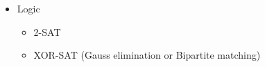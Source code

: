 \documentclass[11.5pt,a4paper,landscape,oneside]{amsart}
\newenvironment{myitemize}
{ \begin{itemize}[leftmargin=.5cm]
    \setlength{\itemsep}{0pt}
    \setlength{\parskip}{0pt}
    \setlength{\parsep}{0pt}     }
{ \end{itemize}                  }
\begin{document}
\begin{multicols*}{2}
\begin{myitemize}
\begin{itemize}
\begin{itemize}
                            \end{itemize}
                        \item Functions
                            \begin{itemize}
                                \item Sum of piecewise-linear functions is a piecewise-linear function
                                \item Sum of convex (concave) functions is convex (concave)
                            \end{itemize}
                        \item Modular arithmetic
                            \begin{itemize}
                                \item Chinese Remainder Theorem
                                \item Linear Congruence
                            \end{itemize}
                        \item Sieve
                        \item System of linear equations
                        \item Values too big to represent?
                            \begin{itemize}
                                \item Compute using the logarithm
                                \item Divide everything by some large value
                            \end{itemize}
                        \item Linear programming
                            \begin{itemize}
                                \item Is the dual problem easier to solve?
                            \end{itemize}
                        \item Can the problem be modeled as a different combinatorial problem? Does that simplify calculations?
                    \end{itemize}
                \item Logic
                    \begin{itemize}
                        \item 2-SAT
                        \item XOR-SAT (Gauss elimination or Bipartite matching)

\end{itemize}
\end{myitemize}
\end{multicols*}
\end{document}
